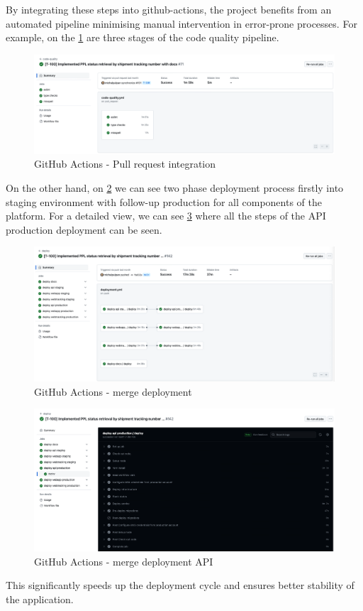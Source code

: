 By integrating these steps into \gls{github-actions}, the project benefits from an automated pipeline minimising manual intervention in error-prone processes.
For example, on the \ref{img06:fig_github_actions_integration} are three stages of the code quality pipeline.
\begin{figure}[H]\centering
\includegraphics[width=140mm]{img/chap06/fig_github_actions_integration.png}
\caption{GitHub Actions - Pull request integration}
\label{img06:fig_github_actions_integration}
\end{figure}
On the other hand, on \ref{img06:fig_github_actions_deployment} we can see two phase deployment process firstly into staging environment with follow-up production for all components of the platform. For a detailed view, we can see \ref{img06:fig_github_actions_api_deployment} where all the steps of the API production deployment can be seen.

\begin{figure}[H]\centering
\includegraphics[width=140mm]{img/chap06/fig_github_actions_deployment.png}
\caption{GitHub Actions - merge deployment}
\label{img06:fig_github_actions_deployment}
\end{figure}
\begin{figure}[H]\centering
\includegraphics[width=140mm]{img/chap06/fig_github_actions_api_deployment.png}
\caption{GitHub Actions - merge deployment API}
\label{img06:fig_github_actions_api_deployment}
\end{figure}

This significantly speeds up the deployment cycle and ensures better stability of the application.




